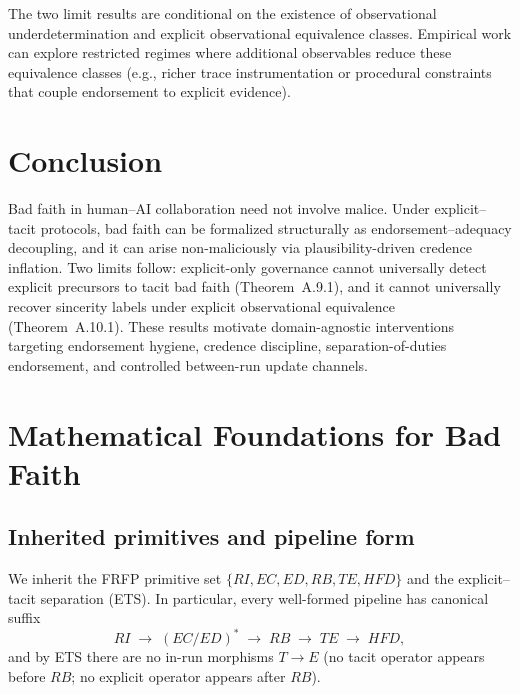 \documentclass[preprints,article,submit,pdftex,moreauthors,accept]{Definitions/mdpi}
\begin{document}
The two limit results are conditional on the existence of observational underdetermination and explicit observational equivalence classes. Empirical work can explore restricted regimes where additional observables reduce these equivalence classes (e.g., richer trace instrumentation or procedural constraints that couple endorsement to explicit evidence).

\section{Conclusion}
Bad faith in human--AI collaboration need not involve malice. Under explicit--tacit protocols, bad faith can be formalized structurally as endorsement--adequacy decoupling, and it can arise non-maliciously via plausibility-driven credence inflation. Two limits follow: explicit-only governance cannot universally detect explicit precursors to tacit bad faith (Theorem~A.9.1), and it cannot universally recover sincerity labels under explicit observational equivalence (Theorem~A.10.1). These results motivate domain-agnostic interventions targeting endorsement hygiene, credence discipline, separation-of-duties endorsement, and controlled between-run update channels.


\appendix
\section{Mathematical Foundations for Bad Faith}

\subsection{Inherited primitives and pipeline form}
We inherit the FRFP primitive set \(\{RI, EC, ED, RB, TE, HFD\}\) and the explicit--tacit separation (ETS). In particular, every well-formed pipeline has canonical suffix
\[
RI \;\to\; (EC/ED)^\ast \;\to\; RB \;\to\; TE \;\to\; HFD,
\]
and by ETS there are no in-run morphisms \(T\to E\) (no tacit operator appears before \(RB\); no explicit operator appears after \(RB\)).
\end{document}
